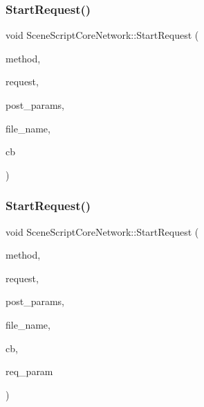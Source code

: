\subsubsection{\texorpdfstring{Start\+Request()}{StartRequest()}\hspace{0.1cm}{\footnotesize\ttfamily [1/2]}}
{\footnotesize\ttfamily void Scene\+Script\+Core\+Network\+::\+Start\+Request (\begin{DoxyParamCaption}\item[{string \&in}]{method,  }\item[{string \&in}]{request,  }\item[{string \&in}]{post\+\_\+params,  }\item[{string \&in}]{file\+\_\+name,  }\item[{Callback1\+I1S @}]{cb }\end{DoxyParamCaption})}

\hypertarget{class_scene_script_core_network_aa6fdc692a9be491752fd6c6ed6773ede}{}\label{class_scene_script_core_network_aa6fdc692a9be491752fd6c6ed6773ede} 
\subsubsection{\texorpdfstring{Start\+Request()}{StartRequest()}\hspace{0.1cm}{\footnotesize\ttfamily [2/2]}}
{\footnotesize\ttfamily void Scene\+Script\+Core\+Network\+::\+Start\+Request (\begin{DoxyParamCaption}\item[{string \&in}]{method,  }\item[{string \&in}]{request,  }\item[{string \&in}]{post\+\_\+params,  }\item[{string \&in}]{file\+\_\+name,  }\item[{Callback1\+I2S @}]{cb,  }\item[{string \&in}]{req\+\_\+param }\end{DoxyParamCaption})}


